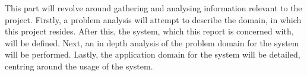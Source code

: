 This part will revolve around gathering and analysing information relevant to the project.
Firstly, a problem analysis will attempt to describe the domain, in which this project resides.
After this, the system, which this report is concerned with, will be defined.
Next, an in depth analysis of the problem domain for the system will be performed.
Lastly, the application domain for the system will be detailed, centring around the usage of the system.
